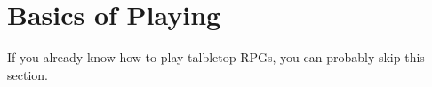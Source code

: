 \section{Basics of Playing}
\par
If you already know how to play talbletop RPGs, you can probably skip this section.